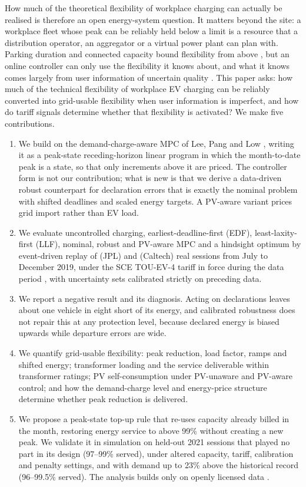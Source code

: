 How much of the theoretical flexibility of workplace charging can actually be realised is therefore an open energy-system question. It matters beyond the site: a workplace fleet whose peak can be reliably held below a limit is a resource that a distribution operator, an aggregator or a virtual power plant can plan with. Parking duration and connected capacity bound flexibility from above \cite{Develder2016Flex,Schuller2015Flex}, but an online controller can only use the flexibility it knows about, and what it knows comes largely from user information of uncertain quality \cite{Lee2019ACNData,Kreft2024Predictability}. This paper asks: how much of the technical flexibility of workplace EV charging can be reliably converted into grid-usable flexibility when user information is imperfect, and how do tariff signals determine whether that flexibility is activated? We make five contributions.
\begin{enumerate}
\item We build on the demand-charge-aware MPC of Lee, Pang and Low \cite{Lee2020Pricing}, writing it as a peak-state receding-horizon linear program in which the month-to-date peak is a state, so that only increments above it are priced. The controller form is not our contribution; what is new is that we derive a data-driven robust counterpart for declaration errors that is exactly the nominal problem with shifted deadlines and scaled energy targets. A PV-aware variant prices grid import rather than EV load.
\item We evaluate uncontrolled charging, earliest-deadline-first (EDF), least-laxity-first (LLF), nominal, robust and PV-aware MPC and a hindsight optimum by event-driven replay of \JPLtestN{} (JPL) and \CALtestN{} (Caltech) real sessions from July to December 2019, under the SCE TOU-EV-4 tariff in force during the data period \cite{SCETOUEV4}, with uncertainty sets calibrated strictly on preceding data.
\item We report a negative result and its diagnosis. Acting on declarations leaves about one vehicle in eight short of its energy, and calibrated robustness does not repair this at any protection level, because declared energy is biased upwards while departure errors are wide.
\item We quantify grid-usable flexibility: peak reduction, load factor, ramps and shifted energy; transformer loading and the service deliverable within transformer ratings; PV self-consumption under PV-unaware and PV-aware control; and how the demand-charge level and energy-price structure determine whether peak reduction is delivered.
\item We propose a peak-state top-up rule that re-uses capacity already billed in the month, restoring energy service to above 99\% without creating a new peak. We validate it in simulation on held-out 2021 sessions that played no part in its design (97--99\% served), under altered capacity, tariff, calibration and penalty settings, and with demand up to 23\% above the historical record (96--99.5\% served). The analysis builds only on openly licensed data \cite{ACNDataset,Yeh2023SustainGym}.
\end{enumerate}

